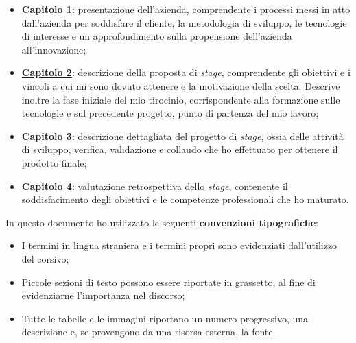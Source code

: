 \begin{itemize}
  \item \hyperref[cap:contesto-aziendale]{\textbf{Capitolo 1}}: presentazione dell'azienda, comprendente i processi messi in atto dall'azienda per soddisfare il cliente, la metodologia di sviluppo, le tecnologie di interesse e un approfondimento sulla propensione dell'azienda all'innovazione;
  \item \hyperref[cap:progetto-contesto-aziendale]{\textbf{Capitolo 2}}: descrizione della proposta di \textit{stage}, comprendente gli obiettivi e i vincoli a cui mi sono dovuto attenere e la motivazione della scelta. Descrive inoltre la fase iniziale del mio tirocinio, corrispondente alla formazione sulle tecnologie e sul precedente progetto, punto di partenza del mio lavoro;
  \item \hyperref[cap:progetto-stage]{\textbf{Capitolo 3}}: descrizione dettagliata del progetto di \textit{stage}, ossia delle attività di sviluppo, verifica, validazione e collaudo che ho effettuato per ottenere il prodotto finale;
  \item \hyperref[cap:valutazioni-retrospettive]{\textbf{Capitolo 4}}: valutazione retrospettiva dello \textit{stage}, contenente il soddisfacimento degli obiettivi e le competenze professionali che ho maturato.
\end{itemize}

In questo documento ho utilizzato le seguenti \textbf{convenzioni tipografiche}:
\begin{itemize}
  \item I termini in lingua straniera e i termini propri sono evidenziati dall'utilizzo del corsivo;
  \item Piccole sezioni di testo possono essere riportate in grassetto, al fine di evidenziarne l'importanza nel discorso;
  \item Tutte le tabelle e le immagini riportano un numero progressivo, una descrizione e, se provengono da una risorsa esterna, la fonte.
\end{itemize}


%
%

\endgroup

\vfill
